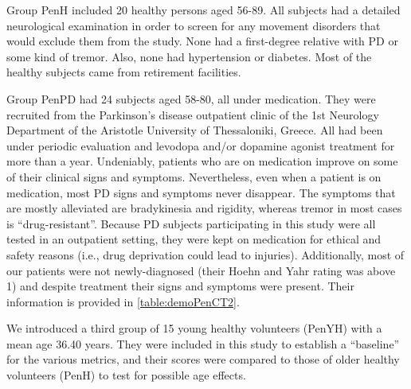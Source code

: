 Group \gls{PenH} included 20 healthy persons aged 56-89. All subjects had a detailed neurological examination in order to screen for any movement disorders that would exclude them from the study. None had a first-degree relative with \gls{PD} or some kind of tremor. Also, none had hypertension or diabetes. Most of the healthy subjects came from retirement facilities.

Group \gls{PenPD} had 24 subjects aged 58-80, all under medication. They were recruited from the Parkinson's disease outpatient clinic of the 1st Neurology Department of the Aristotle University of Thessaloniki, Greece. All had been under periodic evaluation and levodopa and/or dopamine agonist treatment for more than a year. Undeniably, patients who are on medication improve on some of their clinical signs and symptoms. Nevertheless, even when a patient is on medication, most \gls{PD} signs and symptoms never disappear. The symptoms that are mostly alleviated are bradykinesia and rigidity, whereas tremor in most cases is ``drug-resistant''. Because \gls{PD} subjects participating in this study were all tested in an outpatient setting, they were kept on medication for ethical and safety reasons (i.e., drug deprivation could lead to injuries). Additionally, most of our patients were not newly-diagnosed (their Hoehn and Yahr rating was above 1) and despite treatment their signs and symptoms were present. Their information is provided in \ref{table:demoPenCT2}. 

We introduced a third group of 15 young healthy volunteers (\gls{PenYH}) with a mean age 36.40 years. They were included in this study to establish a ``baseline'' for the various metrics, and their scores were compared to those of older healthy volunteers (\gls{PenH}) to test for possible age effects.

